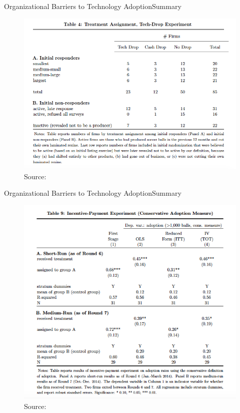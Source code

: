 \documentclass{beamer}
\begin{document}
\begin{frame}{Organizational Barriers to Technology Adoption}{Summary}
\begin{figure}[h]
\begin{centering}
  \includegraphics[width=\textwidth]{atkin4}
  \caption{Source: \cite{Atkin2015}}
   \label{fig:atkin4}
\end{centering}
\end{figure}
\end{frame}

\begin{frame}{Organizational Barriers to Technology Adoption}{Summary}
\begin{figure}[h]
\begin{centering}
  \includegraphics[width=\textwidth]{atkin5}
  \caption{Source: \cite{Atkin2015}}
   \label{fig:atkin5}
\end{centering}
\end{figure}
\end{frame}
\end{document}
